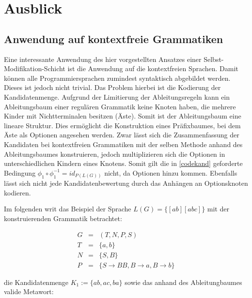 \documentclass[a4paper,12pt]{report}
\begin{document}

\chapter{Ausblick}
\label{ausblick}




\section{Anwendung auf kontextfreie Grammatiken}

Eine interessante Anwendung des hier vorgestellten Ansatzes einer Selbst-Modifikation-Schicht ist die Anwendung auf die kontextfreien Sprachen. Damit können alle Programmiersprachen zumindest syntaktisch abgebildet werden. Dieses ist jedoch nicht trivial. Das Problem hierbei ist die Kodierung der Kandidatenmenge. Aufgrund der Limitierung der Ableitungsregeln kann ein Ableitungsbaum einer regulären Grammatik keine Knoten haben, die mehrere Kinder mit Nichtterminalen besitzen (Äste). Somit ist der Ableitungsbaum eine lineare Struktur. Dies ermöglicht die Konstruktion eines Präfixbaumes, bei dem Äste als Optionen angesehen werden. 
Zwar lässt sich die Zusammenfassung der Kandidaten bei kontextfreien Grammatiken mit der selben Methode anhand des Ableitungsbaumes konstruieren, jedoch multiplizieren sich die Optionen in unterschiedlichen Kindern eines Knotens. Somit gilt die in \ref{codekand} geforderte Bedingung $\phi_1\circ\phi_1^{-1} = id_{P(L(G))}$ nicht, da Optionen hinzu kommen. Ebenfalls lässt sich nicht jede Kandidatenbewertung durch das Anhängen an Optionsknoten kodieren.

Im folgenden writ das Beispiel der Sprache $L(G) = \{ [ab][abc] \}$ mit der konstruierenden Grammatik betrachtet: 

\begin{eqnarray}
  G &=& (T,N,P,S)\\
  T &=& \{ a, b \}\\
  N &=& \{ S, B \} \\
  P &=& \{ S\rightarrow BB, B\rightarrow a, B\rightarrow b\}
\end{eqnarray}

die Kandidatenmenge $K_1:=\{ab, ac, ba\}$ sowie das anhand des Ableitungbaumes valide Metawort: 
\end{document}
